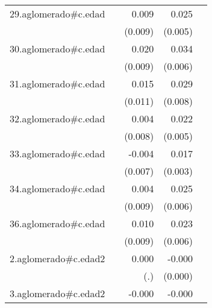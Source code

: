 {\begin{longtable}{l*{4}{D{.}{.}{-1}}}
\addlinespace
29.aglomerado#c.edad&                     &       0.009         &       0.025\sym{***}&                     \\
            &                     &     (0.009)         &     (0.005)         &                     \\
\addlinespace
30.aglomerado#c.edad&                     &       0.020\sym{*}  &       0.034\sym{***}&                     \\
            &                     &     (0.009)         &     (0.006)         &                     \\
\addlinespace
31.aglomerado#c.edad&                     &       0.015         &       0.029\sym{***}&                     \\
            &                     &     (0.011)         &     (0.008)         &                     \\
\addlinespace
32.aglomerado#c.edad&                     &       0.004         &       0.022\sym{***}&                     \\
            &                     &     (0.008)         &     (0.005)         &                     \\
\addlinespace
33.aglomerado#c.edad&                     &      -0.004         &       0.017\sym{***}&                     \\
            &                     &     (0.007)         &     (0.003)         &                     \\
\addlinespace
34.aglomerado#c.edad&                     &       0.004         &       0.025\sym{***}&                     \\
            &                     &     (0.009)         &     (0.006)         &                     \\
\addlinespace
36.aglomerado#c.edad&                     &       0.010         &       0.023\sym{***}&                     \\
            &                     &     (0.009)         &     (0.006)         &                     \\
\addlinespace
2.aglomerado#c.edad2&                     &       0.000         &      -0.000         &                     \\
            &                     &         (.)         &     (0.000)         &                     \\
\addlinespace
3.aglomerado#c.edad2&                     &      -0.000         &      -0.000\sym{***}&                     \\

\end{longtable}}
